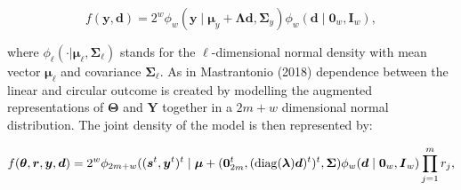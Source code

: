 \documentclass[12pt,]{article}
\begin{document}
\begin{equation}\label{YDjoint}
f(\boldsymbol{y}, \boldsymbol{d}) = 2^w\phi_w(\boldsymbol{y} \mid \boldsymbol{\mu}_y + \boldsymbol{\Lambda}\boldsymbol{d}, \boldsymbol{\Sigma}_y) \phi_w(\boldsymbol{d} \mid \boldsymbol{0}_w, \boldsymbol{I}_w),\nonumber
\end{equation}

\noindent where
\(\phi_\ell(\cdot|\boldsymbol{\mu}_\ell,\boldsymbol{\Sigma}_\ell)\)
stands for the \(\ell\)-dimensional normal density with mean vector
\(\boldsymbol{\mu}_\ell\) and covariance \(\boldsymbol{\Sigma}_\ell\).
As in Mastrantonio (2018) dependence between the linear and circular
outcome is created by modelling the augmented representations of
\(\boldsymbol{\Theta}\) and \(\boldsymbol{Y}\) together in a \(2m + w\)
dimensional normal distribution. The joint density of the model is then
represented by:

\begin{equation}\label{YDThetarjoint} 
f(\boldsymbol{\theta}, \boldsymbol{r},
\boldsymbol{y}, \boldsymbol{d}) = 2^w\phi_{2m+w}((\boldsymbol{s}^t,
\boldsymbol{y}^t)^t \mid \boldsymbol{\mu} + (\boldsymbol{0}_{2m}^t, ({\rm
diag}(\boldsymbol{\lambda})\boldsymbol{d})^t)^t, \boldsymbol{\Sigma})
\phi_w(\boldsymbol{d} \mid \boldsymbol{0}_w, \boldsymbol{I}_w) \prod_{j =
1}^{m}r_j, 
\end{equation}
\end{document}
